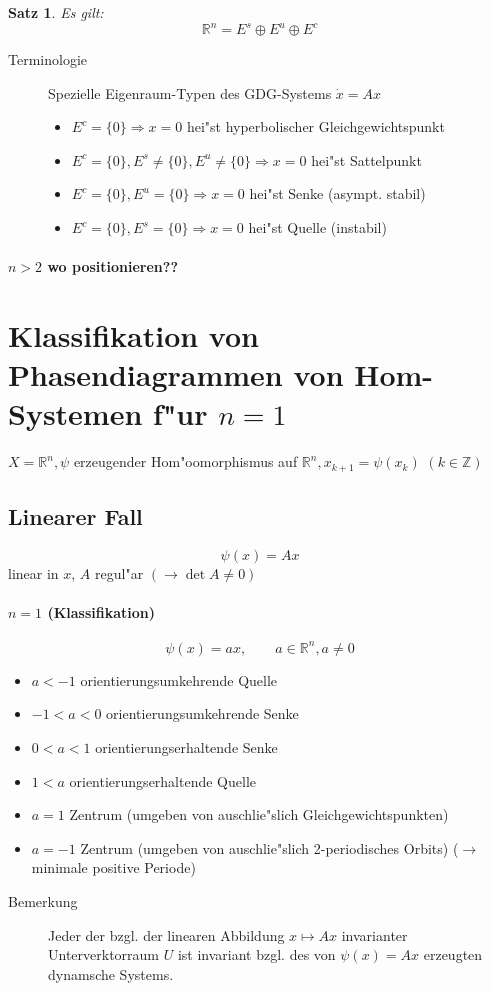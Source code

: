 \documentclass[a4paper, 13pt]{scrreprt}
\newtheorem{satz}{Satz}[section]
\theoremstyle{definition} \newtheorem{definition}{Definition}[section]
\newcommand{\RR}{\mathbb{R}}
\begin{document}
\begin{satz}
Es gilt: 
	\[\RR^n = E^s \oplus E^u \oplus E^c \]
\end{satz}

\begin{description}
	\item[Terminologie]Spezielle Eigenraum-Typen des GDG-Systems $\dot x = Ax$ \\
	\begin{itemize}
		\item \(E^c = \{0\} \Rightarrow x =0\) hei"st hyperbolischer Gleichgewichtspunkt 
		\item \(E^c = \{0\}, {E^s \not= \{0\}, E^u \not= \{0\}} \Rightarrow x =0\) hei"st Sattelpunkt
		\item \(E^c = \{0\}, E^u = \{0\} \Rightarrow x =0\) hei"st Senke (asympt. stabil) 
		\item \(E^c = \{0\}, E^s = \{0\} \Rightarrow x =0\) hei"st Quelle (instabil)
		
	\end{itemize}
\end{description}
\paragraph {\(n > 2\) wo positionieren??} 


\section{Klassifikation von Phasendiagrammen von Hom-Systemen f"ur $n=1$}

\(X = \RR^n, \psi \) erzeugender Hom"oomorphismus auf \(\RR^n, x_{k+1} = \psi(x_k)\) \((k \in \mathbb{Z})\)

\subsection{Linearer Fall}
	\[\psi(x) = Ax\]
	linear in \(x\), \(A\) regul"ar \((\to \det A \not= 0) \)
	
\paragraph{\(n = 1\) (Klassifikation)}
	\[ \psi(x) = ax, \qquad a \in \RR^n, a \not= 0 \]
	\begin{itemize}
		\item \( a < -1\) orientierungsumkehrende Quelle
		\item \(-1 < a < 0\) orientierungsumkehrende Senke
		\item \(0 < a < 1\) orientierungserhaltende Senke
		\item \( 1 < a\) orientierungserhaltende Quelle
		\item \( a = 1\) Zentrum (umgeben von auschlie"slich Gleichgewichtspunkten)
		\item \( a = -1 \) Zentrum (umgeben von auschlie"slich 2-periodisches Orbits) (\(\to\) minimale positive Periode)
		
	\end{itemize}
	
\begin{description}
\item[Bemerkung]
	Jeder der bzgl. der linearen Abbildung \(x\mapsto Ax \) invarianter Unterverktorraum \(U\) ist invariant bzgl. des von \(\psi(x) = Ax \) erzeugten dynamsche Systems.
\end{description}
\end{document}
